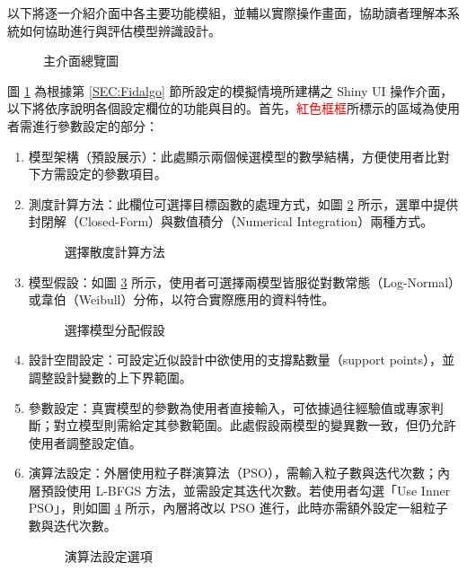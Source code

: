 以下將逐一介紹介面中各主要功能模組，並輔以實際操作畫面，協助讀者理解本系統如何協助進行與評估模型辨識設計。

\begin{figure}[H]
    \caption{主介面總覽圖}
    \label{fig:Fidalgo-shiny1}
\end{figure}

圖 \ref{fig:Fidalgo-shiny1} 為根據第 \ref{SEC:Fidalgo} 節所設定的模擬情境所建構之 Shiny UI 操作介面，以下將依序說明各個設定欄位的功能與目的。首先，\textcolor{red}{紅色框框}所標示的區域為使用者需進行參數設定的部分：

\begin{enumerate}
\item 模型架構（預設展示）：此處顯示兩個候選模型的數學結構，方便使用者比對下方需設定的參數項目。
\item 測度計算方法：此欄位可選擇目標函數的處理方式，如圖 \ref{fig:Fidalgo-shiny3} 所示，選單中提供封閉解（Closed-Form）與數值積分（Numerical Integration）兩種方式。

\begin{figure}[H]
    \caption{選擇散度計算方法}
    \label{fig:Fidalgo-shiny3}
\end{figure}

\item 模型假設：如圖 \ref{fig:Fidalgo-shiny4} 所示，使用者可選擇兩模型皆服從對數常態（Log-Normal）或韋伯（Weibull）分佈，以符合實際應用的資料特性。

\begin{figure}[H]
    \caption{選擇模型分配假設}
    \label{fig:Fidalgo-shiny4}
\end{figure}

\item 設計空間設定：可設定近似設計中欲使用的支撐點數量（support points），並調整設計變數的上下界範圍。
\item 參數設定：真實模型的參數為使用者直接輸入，可依據過往經驗值或專家判斷；對立模型則需給定其參數範圍。此處假設兩模型的變異數一致，但仍允許使用者調整設定值。
\item 演算法設定：外層使用粒子群演算法（PSO），需輸入粒子數與迭代次數；內層預設使用 L-BFGS 方法，並需設定其迭代次數。若使用者勾選「Use Inner PSO」，則如圖 \ref{fig:Fidalgo-shiny5} 所示，內層將改以 PSO 進行，此時亦需額外設定一組粒子數與迭代次數。

\begin{figure}[H]
    \caption{演算法設定選項}
    \label{fig:Fidalgo-shiny5}
\end{figure}

\end{enumerate}

